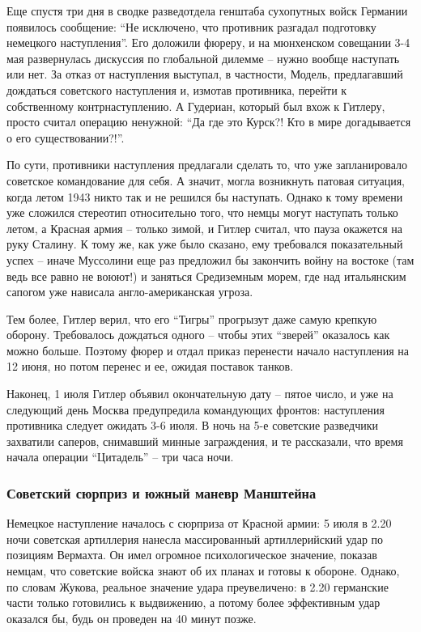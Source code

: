 Еще спустя три дня в сводке разведотдела генштаба сухопутных войск Германии
появилось сообщение: \enquote{Не исключено, что противник разгадал подготовку немецкого
наступления}. Его доложили фюреру, и на мюнхенском совещании 3-4 мая
развернулась дискуссия по глобальной дилемме – нужно вообще наступать или нет.
За отказ от наступления выступал, в частности, Модель, предлагавший дождаться
советского наступления и, измотав противника, перейти к собственному
контрнаступлению. А Гудериан, который был вхож к Гитлеру, просто считал
операцию ненужной: \enquote{Да где это Курск?! Кто в мире догадывается о его
существовании?!}.

По сути, противники наступления предлагали сделать то, что уже запланировало
советское командование для себя. А значит, могла возникнуть патовая ситуация,
когда летом 1943 никто так и не решился бы наступать. Однако к тому времени уже
сложился стереотип относительно того, что немцы могут наступать только летом, а
Красная армия – только зимой, и Гитлер считал, что пауза окажется на руку
Сталину. К тому же, как уже было сказано, ему требовался показательный успех –
иначе Муссолини еще раз предложил бы закончить войну на востоке (там ведь все
равно не воюют!) и заняться Средиземным морем, где над итальянским сапогом уже
нависала англо-американская угроза. 

Тем более, Гитлер верил, что его \enquote{Тигры} прогрызут даже самую крепкую оборону.
Требовалось дождаться одного – чтобы этих \enquote{зверей} оказалось как можно больше.
Поэтому фюрер и отдал приказ перенести начало наступления на 12 июня, но потом
перенес и ее, ожидая поставок танков.

Наконец, 1 июля Гитлер объявил окончательную дату – пятое число, и уже на
следующий день Москва предупредила командующих фронтов: наступления противника
следует ожидать 3-6 июля. В ночь на 5-е советские разведчики захватили саперов,
снимавший минные заграждения, и те рассказали, что время начала операции
\enquote{Цитадель} – три часа ночи.

\subsubsection{Советский сюрприз и южный маневр Манштейна}

Немецкое наступление началось с сюрприза от Красной армии: 5 июля в 2.20 ночи
советская артиллерия нанесла массированный артиллерийский удар по позициям
Вермахта. Он имел огромное психологическое значение, показав немцам, что
советские войска знают об их планах и готовы к обороне. Однако, по словам
Жукова, реальное значение удара преувеличено: в 2.20 германские части только
готовились к выдвижению, а потому более эффективным удар оказался бы, будь он
проведен на 40 минут позже.


